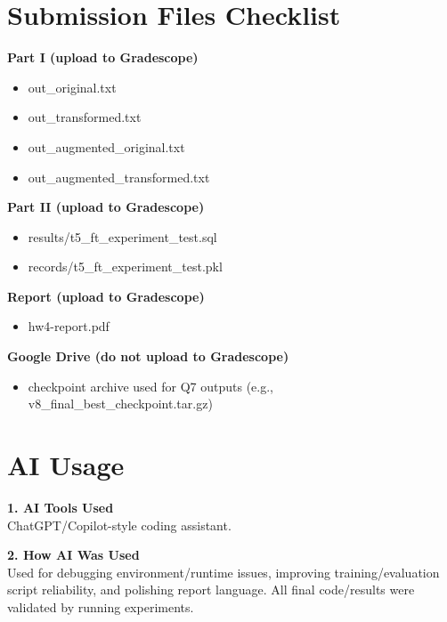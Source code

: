 \documentclass{article}
\begin{document}
\section*{Submission Files Checklist}
\textbf{Part I (upload to Gradescope)}
\begin{itemize}
  \item out\_original.txt
  \item out\_transformed.txt
  \item out\_augmented\_original.txt
  \item out\_augmented\_transformed.txt
\end{itemize}

\textbf{Part II (upload to Gradescope)}
\begin{itemize}                                                                         
  \item results/t5\_ft\_experiment\_test.sql
  \item records/t5\_ft\_experiment\_test.pkl
\end{itemize}

\textbf{Report (upload to Gradescope)}
\begin{itemize}
  \item hw4-report.pdf
\end{itemize}

\textbf{Google Drive (do not upload to Gradescope)}
\begin{itemize}
  \item checkpoint archive used for Q7 outputs (e.g., v8\_final\_best\_checkpoint.tar.gz)
\end{itemize}

\section*{AI Usage}
\noindent\textbf{1. AI Tools Used}\\
ChatGPT/Copilot-style coding assistant.

\noindent\textbf{2. How AI Was Used}\\
Used for debugging environment/runtime issues, improving training/evaluation script reliability,
and polishing report language. All final code/results were validated by running experiments.
\end{document}
